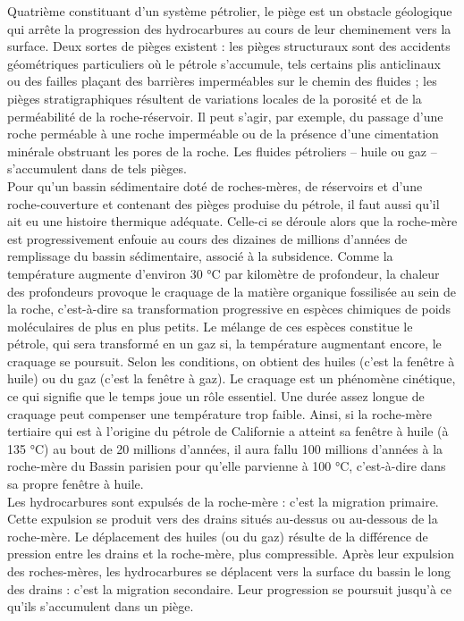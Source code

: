 \documentclass[8pt]{article}
\begin{document}
Quatrième constituant d'un système pétrolier, le piège est un obstacle géologique qui arrête la progression des hydrocarbures au cours de leur cheminement vers la surface. Deux sortes de pièges existent : les pièges structuraux sont des accidents géométriques particuliers où le pétrole s'accumule, tels certains plis anticlinaux ou des failles plaçant des barrières imperméables sur le chemin des fluides ; les pièges stratigraphiques résultent de variations locales de la porosité et de la perméabilité de la roche-réservoir. Il peut s'agir, par exemple, du passage d'une roche perméable à une roche imperméable ou de la présence d'une cimentation minérale obstruant les pores de la roche. Les fluides pétroliers – huile ou gaz – s'accumulent dans de tels pièges.\\

Pour qu'un bassin sédimentaire doté de roches-mères, de réservoirs et d'une roche-couverture et contenant des pièges produise du pétrole, il faut aussi qu'il ait eu une histoire thermique adéquate. Celle-ci se déroule alors que la roche-mère est progressivement enfouie au cours des dizaines de millions d'années de remplissage du bassin sédimentaire, associé à la subsidence. Comme la température augmente d'environ 30 °C par kilomètre de profondeur, la chaleur des profondeurs provoque le craquage de la matière organique fossilisée au sein de la roche, c'est-à-dire sa transformation progressive en espèces chimiques de poids moléculaires de plus en plus petits. Le mélange de ces espèces constitue le pétrole, qui sera transformé en un gaz si, la température augmentant encore, le craquage se poursuit. Selon les conditions, on obtient des huiles (c'est la fenêtre à huile) ou du gaz (c'est la fenêtre à gaz). Le craquage est un phénomène cinétique, ce qui signifie que le temps joue un rôle essentiel. Une durée assez longue de craquage peut compenser une température trop faible. Ainsi, si la roche-mère tertiaire qui est à l'origine du pétrole de Californie a atteint sa fenêtre à huile (à 135 °C) au bout de 20 millions d'années, il aura fallu 100 millions d'années à la roche-mère du Bassin parisien pour qu'elle parvienne à 100 °C, c'est-à-dire dans sa propre fenêtre à huile.\\

Les hydrocarbures sont expulsés de la roche-mère : c'est la migration primaire. Cette expulsion se produit vers des drains situés au-dessus ou au-dessous de la roche-mère. Le déplacement des huiles (ou du gaz) résulte de la différence de pression entre les drains et la roche-mère, plus compressible. Après leur expulsion des roches-mères, les hydrocarbures se déplacent vers la surface du bassin le long des drains : c'est la migration secondaire. Leur progression se poursuit jusqu'à ce qu'ils s'accumulent dans un piège.\\
\end{document}

